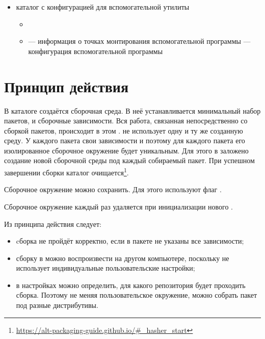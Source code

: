 \begin{itemize}
	\item {} каталог с конфигурацией для вспомогательной утилиты 
	\begin{itemize}
		\item {}
		\item {} --- информация о точках монтирования вспомогательной программы 
		 --- конфигурация вспомогательной программы 
	\end{itemize} 
\end{itemize}


\section{Принцип действия}
В каталоге  создаётся сборочная среда. В неё устанавливается минимальный набор пакетов,  и сборочные зависимости. Вся работа, связанная непосредственно со сборкой пакетов, происходит в этом .  не использует одну и ту же созданную среду. У каждого пакета свои зависимости и поэтому для каждого пакета его изолированное сборочное окружение будет уникальным. Для этого в  заложено создание новой сборочной среды под каждый собираемый пакет. При успешном завершении сборки каталог  очищается\footnote{\href{https://alt-packaging-guide.github.io/\#_hasher_start}{https://alt-packaging-guide.github.io/\#\_hasher\_start}}.

Сборочное окружение можно сохранить. Для этого используют флаг .

Сборочное окружение каждый раз удаляется при инициализации нового .

Из принципа действия  следует:
\begin{itemize}
	\item cборка не пройдёт корректно, если в пакете не указаны все зависимости;
	\item сборку в  можно воспроизвести на другом компьютере, поскольку  не использует индивидуальные пользовательские настройки;
	\item в настройках можно определить, для какого репозитория будет проходить сборка. Поэтому не меняя пользовательское окружение, можно собрать пакет под разные дистрибутивы.
\end{itemize}


